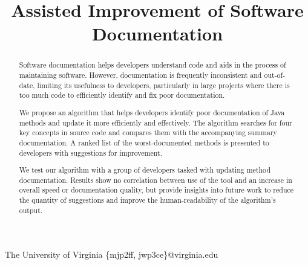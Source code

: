 \documentclass[preprint]{sigplanconf}
\begin{document}
\setlength{\pdfpageheight}{\paperheight}
\setlength{\pdfpagewidth}{\paperwidth}





\title{Assisted Improvement of Software Documentation}

           {The University of Virginia}
           {\{mjp2ff, jwp3ce\}@virginia.edu}
           
\maketitle

\begin{abstract}
Software documentation helps developers understand code and aids in the process of maintaining software. However, documentation is frequently inconsistent and out-of-date, limiting its usefulness to developers, particularly in large projects where there is too much code to efficiently identify and fix poor documentation.

We propose an algorithm that helps developers identify poor documentation of Java methods and update it more efficiently and effectively. The algorithm searches for four key concepts in source code and compares them with the accompanying summary documentation. A ranked list of the worst-documented methods is presented to developers with suggestions for improvement.

We test our algorithm with a group of developers tasked with updating method documentation. Results show no correlation between use of the tool and an increase in overall speed or documentation quality, but provide insights into future work to reduce the quantity of suggestions and improve the human-readability of the algorithm's output.
\end{abstract}
\end{document}
